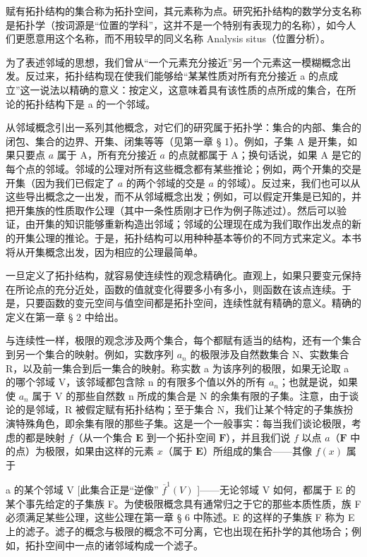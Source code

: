 赋有拓扑结构的集合称为拓扑空间，其元素称为点。研究拓扑结构的数学分支名称是拓扑学（按词源是“位置的学科”，这并不是一个特别有表现力的名称），如今人们更愿意用这个名称，而不用较早的同义名称 Analysis situs（位置分析）。

为了表述邻域的思想，我们曾从“一个元素充分接近”另一个元素这一模糊概念出发。反过来，拓扑结构现在使我们能够给“某某性质对所有充分接近 a 的点成立”这一说法以精确的意义：按定义，这意味着具有该性质的点所成的集合，在所论的拓扑结构下是 a 的一个邻域。

从邻域概念引出一系列其他概念，对它们的研究属于拓扑学：集合的内部、集合的闭包、集合的边界、开集、闭集等等（见第一章 § 1）。例如，子集 A 是开集，如果只要点 \(a\) 属于 A，所有充分接近 \(a\) 的点就都属于 A；换句话说，如果 A 是它的每个点的邻域。邻域的公理对所有这些概念都有某些推论；例如，两个开集的交是开集（因为我们已假定了 \(a\) 的两个邻域的交是 \(a\) 的邻域）。反过来，我们也可以从这些导出概念之一出发，而不从邻域概念出发；例如，可以假定开集是已知的，并把开集族的性质取作公理（其中一条性质刚才已作为例子陈述过）。然后可以验证，由开集的知识能够重新构造出邻域；邻域的公理现在成为我们取作出发点的新的开集公理的推论。于是，拓扑结构可以用种种基本等价的不同方式来定义。本书将从开集概念出发，因为相应的公理最简单。

一旦定义了拓扑结构，就容易使连续性的观念精确化。直观上，如果只要变元保持在所论点的充分近处，函数的值就变化得要多小有多小，则函数在该点连续。于是，只要函数的变元空间与值空间都是拓扑空间，连续性就有精确的意义。精确的定义在第一章 § 2 中给出。

与连续性一样，极限的观念涉及两个集合，每个都赋有适当的结构，还有一个集合到另一个集合的映射。例如，实数序列 \(a_{n}\) 的极限涉及自然数集合 N、实数集合 R，以及前一集合到后一集合的映射。称实数 a 为该序列的极限，如果无论取 a 的哪个邻域 V，该邻域都包含除 n 的有限多个值以外的所有 \(a_{n}\)；也就是说，如果使 \(a_{n}\) 属于 V 的那些自然数 n 所成的集合是 N 的余集有限的子集。注意，由于谈论的是邻域，R 被假定赋有拓扑结构；至于集合 N，我们让某个特定的子集族扮演特殊角色，即余集有限的那些子集。这是一个一般事实：每当我们谈论极限，考虑的都是映射 \(f\)（从一个集合 \(\mathbf{E}\) 到一个拓扑空间 \(\mathbf{F}\)），并且我们说 \(f\) 以点 \(a\)（\(\mathbf{F}\) 中的点）为极限，如果由这样的元素 \(x\)（属于 \(\mathbf{E}\)）所组成的集合——其像 \(f(x)\) 属于

a 的某个邻域 V {[}此集合正是“逆像” \(\overline{f}^{1}(V)\) {]}——无论邻域 V 如何，都属于 E 的某个事先给定的子集族 F。为使极限概念具有通常归之于它的那些本质性质，族 F 必须满足某些公理，这些公理在第一章 § 6 中陈述。E 的这样的子集族 F 称为 E 上的滤子。滤子的概念与极限的概念不可分离，它也出现在拓扑学的其他场合；例如，拓扑空间中一点的诸邻域构成一个滤子。

